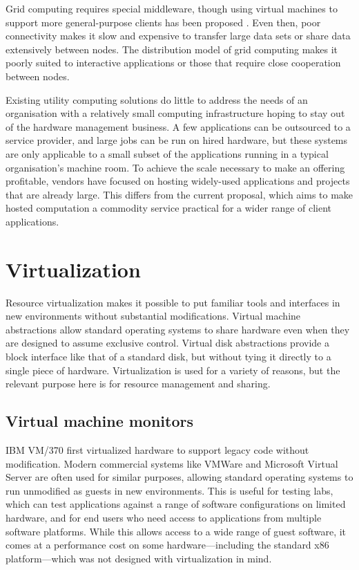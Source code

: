 Grid computing requires special middleware, though using virtual machines to support more general-purpose clients has been proposed \cite{figueiredo03,zhao04}. Even then, poor connectivity makes it slow and expensive to transfer large data sets or share data extensively between nodes. The distribution model of grid computing makes it poorly suited to interactive applications or those that require close cooperation between nodes.

Existing utility computing solutions do little to address the needs of an organisation with a relatively small computing infrastructure hoping to stay out of the hardware management business. A few applications can be outsourced to a service provider, and large jobs can be run on hired hardware, but these systems are only applicable to a small subset of the applications running in a typical organisation's machine room. To achieve the scale necessary to make an offering profitable, vendors have focused on hosting widely-used applications and projects that are already large. This differs from the current proposal, which aims to make hosted computation a commodity service practical for a wider range of client applications.

\section{Virtualization}

Resource virtualization makes it possible to put familiar tools and interfaces in new environments without substantial modifications. Virtual machine abstractions allow standard operating systems to share hardware even when they are designed to assume exclusive control. Virtual disk abstractions provide a block interface like that of a standard disk, but without tying it directly to a single piece of hardware. Virtualization is used for a variety of reasons, but the relevant purpose here is for resource management and sharing.

\subsection{Virtual machine monitors}

IBM VM/370 \cite{gum} first virtualized hardware to support legacy code without modification. Modern commercial systems like VMWare \cite{vmware} and Microsoft Virtual Server \cite{microsoftvm} are often used for similar purposes, allowing standard operating systems to run unmodified as guests in new environments. This is useful for testing labs, which can test applications against a range of software configurations on limited hardware, and for end users who need access to applications from multiple software platforms. While this allows access to a wide range of guest software, it comes at a performance cost on some hardware---including the standard x86 platform---which was not designed with virtualization in mind.


